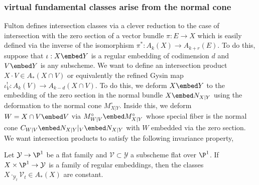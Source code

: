 \documentclass[12pt]{article}
\begin{document}
\subsubsection{virtual fundamental classes arise from the normal cone}

Fulton defines intersection classes via a clever reduction to the case of intersection with the zero section of a vector bundle $\pi : E \to X$ which is easily defined via the inverse of the isomorphism $\pi^* : A_k(X) \to A_{k+r}(E)$. To do this, suppose that $\iota : X \embed Y$ is a regular embedding of codimension $d$ and $V \embed Y$ is any subscheme. We want to define an intersection product $X \cdot V \in A_*(X \cap V)$ or equivalently the refined Gysin map $\iota^!_V : A_k(V) \to A_{k-d}(X \cap V)$. To do this, we deform $X \embed Y$ to the embedding of the zero section in the normal bundle $X \embed N_{X|Y}$ using the deformation to the normal cone $M^\circ_{X|Y}$. Inside this, we deform $W = X \cap V \embed V$ via $M^\circ_{W|V} \embed M^\circ_{X|Y}$ whose special fiber is the normal cone $C_{W|V} \embed N_{X|Y}|_V \embed N_{X|Y}$ with $W$ embedded via the zero section. We want intersection products to satisfy the following invariance property,

\begin{center}
Let $\mathcal{Y} \to \P^1$ be a flat family and $\mathcal{V} \subset \mathcal{Y}$ a subscheme flat over $\P^1$. If $X \times \P^1 \to \mathcal{Y}$ is a family of regular embeddings, then the classes $X \cdot_{\mathcal{Y}_t} \mathcal{V}_t \in A_*(X)$ are constant. 
\end{center}
\end{document}
